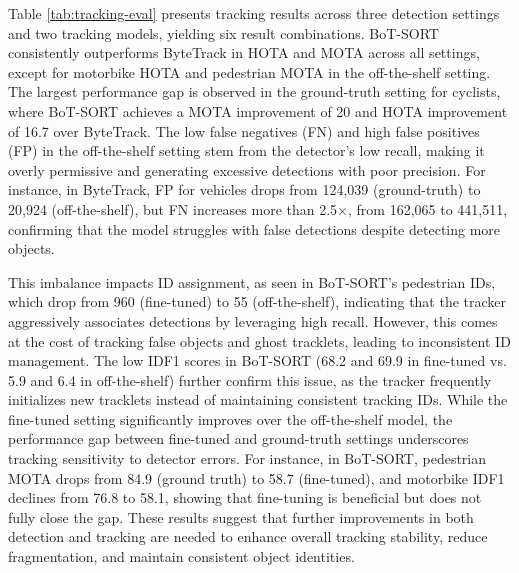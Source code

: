 Table \ref{tab:tracking-eval} presents tracking results across three detection settings and two tracking models, yielding six result combinations. BoT-SORT consistently outperforms ByteTrack in HOTA and MOTA across all settings, except for motorbike HOTA and pedestrian MOTA in the off-the-shelf setting. The largest performance gap is observed in the ground-truth setting for cyclists, where BoT-SORT achieves a MOTA improvement of 20 and HOTA improvement of 16.7 over ByteTrack. The low false negatives (FN) and high false positives (FP) in the off-the-shelf setting stem from the detector’s low recall, making it overly permissive and generating excessive detections with poor precision. For instance, in ByteTrack, FP for vehicles drops from 124,039 (ground-truth) to 20,924 (off-the-shelf), but FN increases more than 2.5×, from 162,065 to 441,511, confirming that the model struggles with false detections despite detecting more objects. 

This imbalance impacts ID assignment, as seen in BoT-SORT’s pedestrian IDs, which drop from 960 (fine-tuned) to 55 (off-the-shelf), indicating that the tracker aggressively associates detections by leveraging high recall. However, this comes at the cost of tracking false objects and ghost tracklets, leading to inconsistent ID management. The low IDF1 scores in BoT-SORT (68.2 and 69.9 in fine-tuned vs. 5.9 and 6.4 in off-the-shelf) further confirm this issue, as the tracker frequently initializes new tracklets instead of maintaining consistent tracking IDs. While the fine-tuned setting significantly improves over the off-the-shelf model, the performance gap between fine-tuned and ground-truth settings underscores tracking sensitivity to detector errors. For instance, in BoT-SORT, pedestrian MOTA drops from 84.9 (ground truth) to 58.7 (fine-tuned), and motorbike IDF1 declines from 76.8 to 58.1, showing that fine-tuning is beneficial but does not fully close the gap. These results suggest that further improvements in both detection and tracking are needed to enhance overall tracking stability, reduce fragmentation, and maintain consistent object identities.

